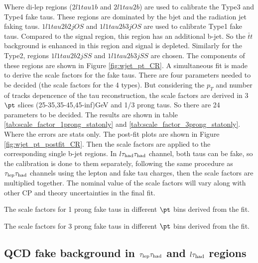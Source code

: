 Where di-lep regions ($2l1tau1b$ and $2l1tau2b$) are used to calibrate the Type3 and Type4 fake taus. These regions are dominated by the bjet and the radiation jet faking taus. $1l1tau2b2j OS$ and $1l1tau2b3j OS$ are used to calibrate Type1 fake taus. Compared to the signal region, this region has an additional b-jet. So the $\bar{t}t$ background is enhanced in this region and signal is depleted. Similarly for the Type2, regions $1l1tau2b2j SS$ and $1l1tau2b3j SS$ are chosen. The components of these regions are shown in Figure \ref{fig:wjet_pt_CR}. A simultaneous fit is made to derive the scale factors for the fake taus. There are four parameters needed to be decided (the scale factors for the 4 types). But considering the $p_{T}$ and number of tracks depencence of the tau reconstruction, the scale factors are derived in 3 $\pt$ slices (25-35,35-45,45-inf)GeV and 1/3 prong taus. So there are 24 parameters to be decided. The results are shown in table \ref{tab:scale_factor_1prong_statonly} and \ref{tab:scale_factor_3prong_statonly}. Where the errors are stats only. The post-fit plots are shown in Figure \ref{fig:wjet_pt_postfit_CR}. Then the scale factors are applied to the corresponding single b-jet regions. In $l\tau_\text{had}{}\tau_\text{had}$ channel, both taus can be fake, so the calibration is done to them separately, following the same procedure as $\tau_\text{lep}{}\tau_\text{had}$ channels using the lepton and fake tau charges, then the scale factors are multiplied together. The nominal value of the scale factors will vary along with other CP and theory uncertainties in the final fit.

\begin{table}
\caption{The scale factors for 1 prong fake taus in different $\pt$ bins derived from the fit.}
\label{tab:scale_factor_1prong_statonly}

\end{table}
\begin{table}
\caption{The scale factors for 3 prong fake taus in different $\pt$ bins derived from the fit.}
\label{tab:scale_factor_3prong_statonly}

\end{table}





\subsection{QCD fake background in $\tau_\text{lep}{}\tau_\text{had}$ and $l\tau_\text{had}$ regions}

